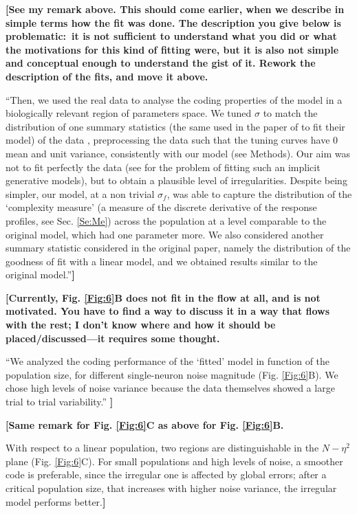 \documentclass[a4paper]{article}%
\begin{document}
\bigskip

\textbf{[See my remark above. This should come earlier, when we describe in
simple terms how the fit was done. The description you give below is
problematic:\ it is not sufficient to understand what you did or what the
motivations for this kind of fitting were, but it is also not simple and
conceptual enough to understand the gist of it. Rework the description of the
fits, and move it above.}

\textquotedblleft Then, we used the real data to analyse the coding properties
of the model in a biologically relevant region of parameters space. We tuned
$\sigma$ to match the distribution of one summary statistics (the same used in
the paper of \cite{Lalazar2016TuningConnectivity} to fit their model) of the
data , preprocessing the data such that the tuning curves have 0 mean and unit
variance, consistently with our model (see Methods). Our aim was not to fit
perfectly the data (see \cite{Arakaki2019InferringCurvesc} for the problem of
fitting such an implicit generative models), but to obtain a plausible level
of irregularities. Despite being simpler, our model, at a non trivial
$\sigma_{f}$, was able to capture the distribution of the `complexity measure'
(a measure of the discrete derivative of the response profiles, see Sec.
\ref{Se:Me}) across the population at a level comparable to the original
model, which had one parameter more. We also considered another summary
statistic considered in the original paper, namely the distribution of the
goodness of fit with a linear model, and we obtained results similar to the
original model.\textquotedblright\textbf{]}

\bigskip

\textbf{[Currently, Fig. \ref{Fig:6}B does not fit in the flow at all, and is
not motivated. You have to find a way to discuss it in a way that flows with
the rest; I don't know where and how it should be placed/discussed---it
requires some thought.}

\textquotedblleft We analyzed the coding performance of the `fitted' model in
function of the population size, for different single-neuron noise magnitude
(Fig. \ref{Fig:6}B). We chose high levels of noise variance because the data
themselves showed a large trial to trial variability.\textquotedblright%
\textbf{]}

\bigskip

\textbf{[Same remark for Fig. \ref{Fig:6}C as above for Fig. \ref{Fig:6}B.}

With respect to a linear population, two regions are distinguishable in the
$N-\eta^{2}$ plane (Fig. \ref{Fig:6}C). For small populations and high levels
of noise, a smoother code is preferable, since the irregular one is affected
by global errors; after a critical population size, that increases with higher
noise variance, the irregular model performs better.\textbf{]}
\end{document}
